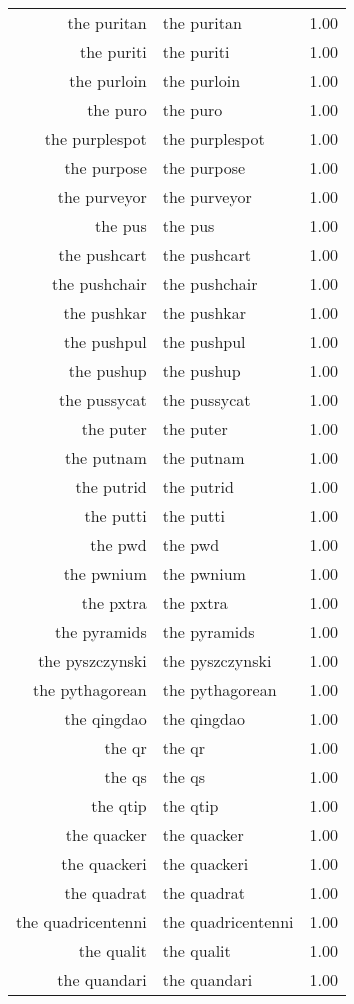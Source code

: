 \begin{table}[ht]
\begin{tabular}{rlr}
  the puritan & the puritan & 1.00 \\ 
  the puriti & the puriti & 1.00 \\ 
  the purloin & the purloin & 1.00 \\ 
  the puro & the puro & 1.00 \\ 
  the purplespot & the purplespot & 1.00 \\ 
  the purpose & the purpose & 1.00 \\ 
  the purveyor & the purveyor & 1.00 \\ 
  the pus & the pus & 1.00 \\ 
  the pushcart & the pushcart & 1.00 \\ 
  the pushchair & the pushchair & 1.00 \\ 
  the pushkar & the pushkar & 1.00 \\ 
  the pushpul & the pushpul & 1.00 \\ 
  the pushup & the pushup & 1.00 \\ 
  the pussycat & the pussycat & 1.00 \\ 
  the puter & the puter & 1.00 \\ 
  the putnam & the putnam & 1.00 \\ 
  the putrid & the putrid & 1.00 \\ 
  the putti & the putti & 1.00 \\ 
  the pwd & the pwd & 1.00 \\ 
  the pwnium & the pwnium & 1.00 \\ 
  the pxtra & the pxtra & 1.00 \\ 
  the pyramids & the pyramids & 1.00 \\ 
  the pyszczynski & the pyszczynski & 1.00 \\ 
  the pythagorean & the pythagorean & 1.00 \\ 
  the qingdao & the qingdao & 1.00 \\ 
  the qr & the qr & 1.00 \\ 
  the qs & the qs & 1.00 \\ 
  the qtip & the qtip & 1.00 \\ 
  the quacker & the quacker & 1.00 \\ 
  the quackeri & the quackeri & 1.00 \\ 
  the quadrat & the quadrat & 1.00 \\ 
  the quadricentenni & the quadricentenni & 1.00 \\ 
  the qualit & the qualit & 1.00 \\ 
  the quandari & the quandari & 1.00 \\ 

\end{tabular}
\end{table}
